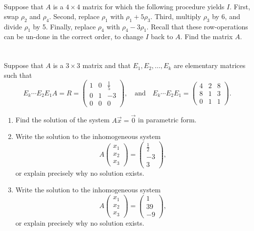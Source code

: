 \documentclass[10pt,oneside]{article}
\begin{document}
\vspace{2in}
\section{ }
Suppose that $A$ is a $4 \times 4$ matrix for which the following procedure
yields $I$.  First, swap $\rho_2$ and $\rho_4$.  Second, replace
$\rho_1$ with $\rho_1 + 5\rho_3$.  Third, multiply $\rho_3$ by 6, and divide
$\rho_1$ by 5.  Finally, replace $\rho_4$ with $\rho_4 - 3 \rho_1$.
Recall that these row-operations can be un-done in the correct order, to change $I$ back to $A$.
Find the matrix $A$.

\newpage
\section{ }
Suppose that $A$ is a $3 \times 3$ matrix and that $E_1, E_2, \ldots, E_k$ are
elementary matrices such that 
\[ 
 E_k \cdots E_2 E_1 A =  R = \begin{pmatrix}
1 & 0 & \frac15\\
0 & 1 & -3\\
0 & 0 & 0
\end{pmatrix},\quad\text{and}\quad
E_k \cdots E_2 E_1 
=
 \begin{pmatrix}
4 & 2 & 8\\
8 & 1 & 3\\
0 & 1 & 1
\end{pmatrix}.
\]
\begin{enumerate}
\item
Find the solution of the system $A\vec{x}=\vec{0}$ in parametric form.

\vspace{2in}

\item 
Write the solution to the inhomogeneous system 
\[ A \begin{pmatrix}
x_1 \\ x_2 \\ x_3
\end{pmatrix} = \begin{pmatrix}\frac12 \\ -3 \\ 3\end{pmatrix},\]
or explain precisely why no solution exists.

\vspace{2in}

\item 
Write the solution to the inhomogeneous system 
\[ A \begin{pmatrix}
x_1 \\ x_2 \\ x_3
\end{pmatrix} =  \begin{pmatrix}1 \\ 39 \\ -9\end{pmatrix},\]
or explain precisely why no solution exists.

\end{enumerate}
\end{document}
